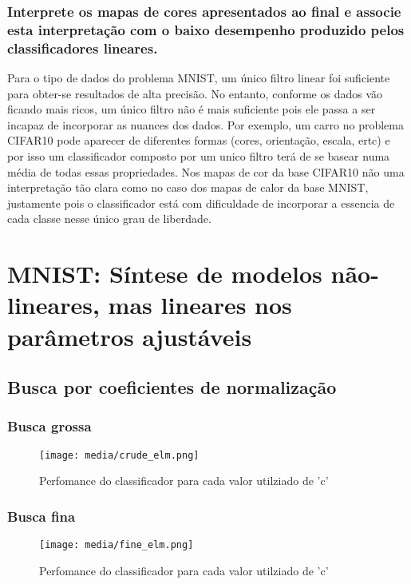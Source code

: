 \documentclass[a4paper]{article}
\begin{document}
\subsubsection{Interprete os mapas de cores apresentados ao final e associe esta interpretação com o baixo desempenho produzido pelos classificadores lineares.}
Para o tipo de dados do problema MNIST, um único filtro linear foi suficiente para obter-se resultados de alta precisão. No entanto, conforme os dados vão ficando mais ricos, um único filtro não é mais suficiente pois ele passa a ser incapaz de incorporar as nuances dos dados. Por exemplo, um carro no problema CIFAR10 pode aparecer de diferentes formas (cores, orientação, escala, ertc) e por isso um classificador composto por um unico filtro terá de se basear numa média de todas essas propriedades. Nos mapas de cor da base CIFAR10 não uma interpretação tão clara como no caso dos mapas de calor da base MNIST, justamente pois o classificador está com dificuldade de incorporar a essencia de cada classe nesse único grau de liberdade.


\section{MNIST: Síntese de modelos não-lineares, mas lineares nos parâmetros ajustáveis}

\subsection{Busca por coeficientes de normalização}

\subsubsection{Busca grossa}

\begin{figure}[H]
    \centering   %
    \centerline{\texttt{[image: media/crude\_elm.png]}}
    \caption{Perfomance do classificador para cada valor utilziado de 'c'}  %
    \label{fig:fig1}  %
\end{figure}

\subsubsection{Busca fina}
\begin{figure}[H]
    \centering   %
    \centerline{\texttt{[image: media/fine\_elm.png]}}
    \caption{Perfomance do classificador para cada valor utilziado de 'c'}  %
    \label{fig:fig2}  %
\end{figure}
\end{document}
